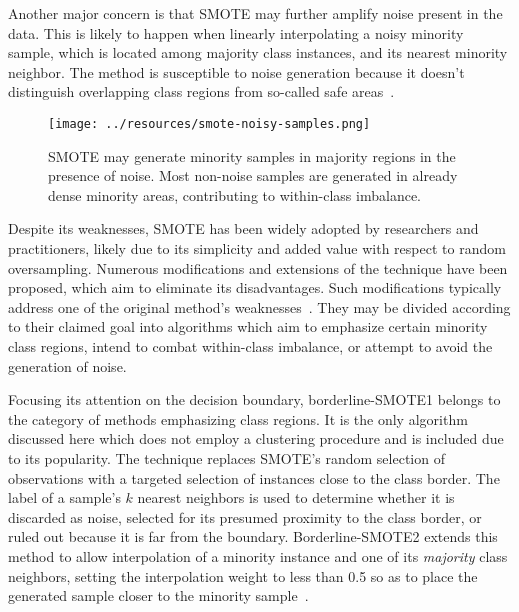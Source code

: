 \documentclass[sort&compress]{elsarticle}
\begin{document}
Another major concern is that \ac{SMOTE} may further amplify noise present in the data. This is likely to happen when linearly interpolating a noisy minority sample, which is located among majority class instances, and its nearest minority neighbor. The method is susceptible to noise generation because it doesn't distinguish overlapping class regions from so-called safe areas~\citep{Bunkhumpornpat.2009,Rivera.2017,Zhu.2017,Saez.2015}. 

\begin{figure}[ht]
    \centering
	\texttt{[image: ../resources/smote-noisy-samples.png]}
	\caption[Behavior of \acs{SMOTE} in the presence of noise and within-class imbalance]{\acs{SMOTE} may generate minority samples in majority regions in the presence of noise. Most non-noise samples are generated in already dense minority areas, contributing to within-class imbalance.}
	\label{fig:smote-noisy-samples}
\end{figure}

Despite its weaknesses, \ac{SMOTE} has been widely adopted by researchers and practitioners, likely due to its simplicity and added value with respect to random oversampling. Numerous modifications and extensions of the technique have been proposed, which aim to eliminate its disadvantages. Such modifications typically address one of the original method's weaknesses~\citep{Vanhoeyveld.2017}. They may be divided according to their claimed goal into algorithms which aim to emphasize certain minority class regions, intend to combat within-class imbalance, or attempt to avoid the generation of noise.

Focusing its attention on the decision boundary, borderline-\ac{SMOTE}1 belongs to the category of methods emphasizing class regions. It is the only algorithm discussed here which does not employ a clustering procedure and is included due to its popularity. The technique replaces \ac{SMOTE}'s random selection of observations with a targeted selection of instances close to the class border. The label of a sample's $k$ nearest neighbors is used to determine whether it is discarded as noise, selected for its presumed proximity to the class border, or ruled out because it is far from the boundary. Borderline-\ac{SMOTE}2 extends this method to allow interpolation of a minority instance and one of its \textit{majority} class neighbors, setting the interpolation weight to less than 0.5 so as to place the generated sample closer to the minority sample~\citep{Han.2005}.
\end{document}
